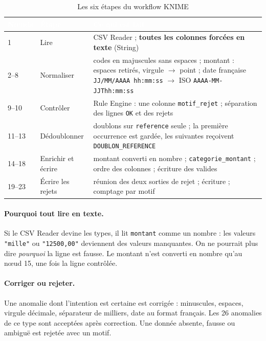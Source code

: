 \begin{table}[H]
\centering\small
\caption{Les six étapes du workflow KNIME}
\label{tab:knime-etapes}
\begin{tabularx}{\linewidth}{|l|l|X|}
\hline
\rowcolor{bluedark}\textcolor{white}{\textbf{Nœuds}} & \textcolor{white}{\textbf{Étape}} & \textcolor{white}{\textbf{Ce qui est fait}} \\
\hline
1 & Lire & CSV Reader ; \textbf{toutes les colonnes forcées en texte} (String) \\
\hline
2--8 & Normaliser & codes en majuscules sans espaces ; montant : espaces retirés, virgule $\rightarrow$ point ; date française \texttt{JJ/MM/AAAA hh:mm:ss} $\rightarrow$ ISO \texttt{AAAA-MM-JJThh:mm:ss} \\
\hline
9--10 & Contrôler & Rule Engine : une colonne \texttt{motif\_rejet} ; séparation des lignes \texttt{OK} et des rejets \\
\hline
11--13 & Dédoublonner & doublons sur \texttt{reference} seule ; la première occurrence est gardée, les suivantes reçoivent \texttt{DOUBLON\_REFERENCE} \\
\hline
14--18 & Enrichir et écrire & montant converti en nombre ; \texttt{categorie\_montant} ; ordre des colonnes ; écriture des valides \\
\hline
19--23 & Écrire les rejets & réunion des deux sorties de rejet ; écriture ; comptage par motif \\
\hline
\end{tabularx}
\end{table}

\paragraph{Pourquoi tout lire en texte.} Si le CSV Reader devine les types, il lit \texttt{montant}
comme un nombre : les valeurs \texttt{"mille"} ou \texttt{"12500,00"} deviennent des valeurs
manquantes. On ne pourrait plus dire \emph{pourquoi} la ligne est fausse. Le montant n'est converti
en nombre qu'au nœud 15, une fois la ligne contrôlée.

\paragraph{Corriger ou rejeter.} Une anomalie dont l'intention est certaine est corrigée : minuscules,
espaces, virgule décimale, séparateur de milliers, date au format français. Les 26 anomalies de ce
type sont acceptées après correction. Une donnée absente, fausse ou ambiguë est rejetée avec un motif.

